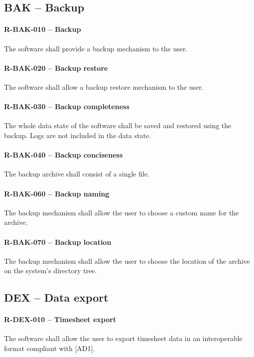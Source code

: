 \subsection{BAK -- Backup}
\paragraph{R-BAK-010 -- Backup}
The software shall provide a backup mechanism to the user.

\paragraph{R-BAK-020 -- Backup restore}
The software shall allow a backup restore mechanism to the user.

\paragraph{R-BAK-030 -- Backup completeness}
The whole data state of the software shall be saved and restored using the
backup. Logs are not included in the data state.

\paragraph{R-BAK-040 -- Backup conciseness}
The backup archive shall consist of a single file.

\paragraph{R-BAK-060 -- Backup naming}
The backup mechanism shall allow the user to choose a custom name for the
archive.

\paragraph{R-BAK-070 -- Backup location}
The backup mechanism shall allow the user to choose the location of the
archive on the system's directory tree.

\subsection{DEX -- Data export}
\paragraph{R-DEX-010 -- Timesheet export}
The software shall allow the user to export timesheet data in an interoperable
format compliant with [AD1].

